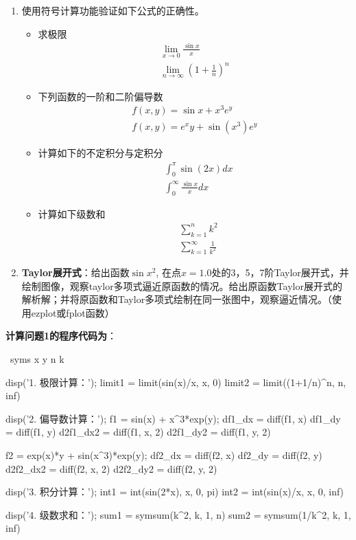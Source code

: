 \documentclass[zihao=-4]{ctexart}
\begin{document}
\begin{enumerate}
\item 使用符号计算功能验证如下公式的正确性。

\begin{itemize}
	\item 求极限
	$$
	\begin{gathered}
		\lim _{x \rightarrow 0} \frac{\sin x}{x} \\
		\lim _{n \rightarrow \infty}\left(1+\frac{1}{n}\right)^n
	\end{gathered}
	$$
	\item 下列函数的一阶和二阶偏导数
	$$
	\begin{gathered}
		f(x, y)=\sin x+x^3 e^y \\
		f(x, y)=e^x y+\sin \left(x^3\right) e^y
	\end{gathered}
	$$
	\item 计算如下的不定积分与定积分
	$$
	\begin{aligned}
		& \int_0^\pi \sin (2 x) d x \\
		& \int_0^{\infty} \frac{\sin x}{x} d x
	\end{aligned}
	$$
	\item 计算如下级数和
	$$
	\begin{aligned}
		& \sum_{k=1}^n k^2 \\
		& \sum_{k=1}^{\infty} \frac{1}{k^2}
	\end{aligned}
	$$
\end{itemize}

\item \textbf{Taylor展开式}：给出函数$\sin x^2$, 在点$x=1.0$处的3，5，7阶Taylor展开式，并绘制图像，观察taylor多项式逼近原函数的情况。给出原函数Taylor展开式的解析解；并将原函数和Taylor多项式绘制在同一张图中，观察逼近情况。（使用ezplot或fplot函数）
\end{enumerate}

\textbf{计算问题1的程序代码为}：
\begin{mcode}
 syms x y n k

disp('1. 极限计算：');
limit1 = limit(sin(x)/x, x, 0)
limit2 = limit((1+1/n)^n, n, inf)

disp('2. 偏导数计算：');
f1 = sin(x) + x^3*exp(y);
df1_dx = diff(f1, x)
df1_dy = diff(f1, y)
d2f1_dx2 = diff(f1, x, 2)
d2f1_dy2 = diff(f1, y, 2)

f2 = exp(x)*y + sin(x^3)*exp(y);
df2_dx = diff(f2, x)
df2_dy = diff(f2, y)
d2f2_dx2 = diff(f2, x, 2)
d2f2_dy2 = diff(f2, y, 2)

disp('3. 积分计算：');
int1 = int(sin(2*x), x, 0, pi)
int2 = int(sin(x)/x, x, 0, inf)

disp('4. 级数求和：');
sum1 = symsum(k^2, k, 1, n)
sum2 = symsum(1/k^2, k, 1, inf)
\end{mcode}
\end{document}
